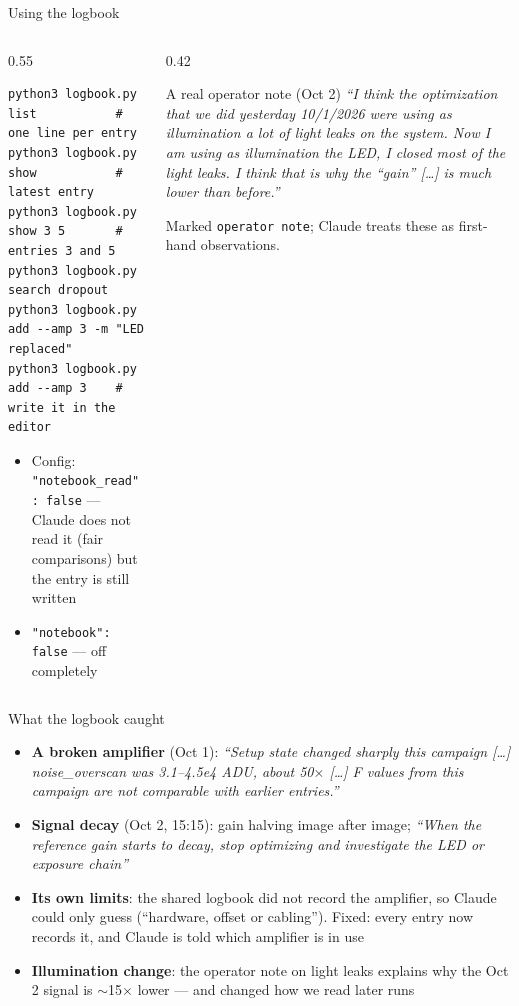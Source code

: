 \documentclass[aspectratio=169,10pt]{beamer}
\begin{document}
\begin{frame}[fragile]{Using the logbook}
  \begin{columns}[T]
    \begin{column}{0.55\textwidth}
\begin{lstlisting}
python3 logbook.py list           # one line per entry
python3 logbook.py show           # latest entry
python3 logbook.py show 3 5       # entries 3 and 5
python3 logbook.py search dropout
python3 logbook.py add --amp 3 -m "LED replaced"
python3 logbook.py add --amp 3    # write it in the editor
\end{lstlisting}
      \small
      \begin{itemize}
        \item Config: \texttt{"notebook\_read": false} --- Claude does not read it
              (fair comparisons) but the entry is still written
        \item \texttt{"notebook": false} --- off completely
      \end{itemize}
    \end{column}
    \begin{column}{0.42\textwidth}
      \begin{block}{A real operator note (Oct 2)}
        \scriptsize\emph{``I think the optimization that we did yesterday 10/1/2026 were using
        as illumination a lot of light leaks on the system. Now I am using as illumination the
        LED, I closed most of the light leaks. I think that is why the ``gain'' [\dots] is much
        lower than before.''}
      \end{block}
      {\scriptsize Marked \texttt{operator note}; Claude treats these as first-hand observations.}
    \end{column}
  \end{columns}
\end{frame}

\begin{frame}{What the logbook caught}
  \begin{itemize}
    \item \textbf{A broken amplifier} (Oct 1): \emph{``Setup state changed sharply this
          campaign [\dots] noise\_overscan was 3.1--4.5e4 ADU, about 50$\times$ [\dots] F values
          from this campaign are not comparable with earlier entries.''}
    \item \textbf{Signal decay} (Oct 2, 15:15): gain halving image after image;
          \emph{``When the reference gain starts to decay, stop optimizing and investigate the
          LED or exposure chain''}
    \item \textbf{Its own limits}: the shared logbook did not record the amplifier, so Claude
          could only guess (``hardware, offset or cabling''). Fixed: every entry now records it,
          and Claude is told which amplifier is in use
    \item \textbf{Illumination change}: the operator note on light leaks explains why the Oct 2
          signal is $\sim$15$\times$ lower --- and changed how we read later runs
  \end{itemize}
\end{frame}
\end{document}
